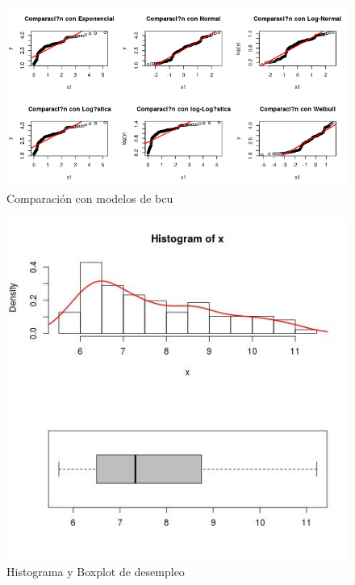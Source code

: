 \documentclass{article}
\begin{document}
\begin{figure}[h!]
\centering
\includegraphics[scale=0.5]{./plots/cm_bcu.png}
\caption{Comparación con modelos de bcu}
\end{figure}
\pagebreak
\begin{figure}[h!]
\centering
\includegraphics[scale=0.5]{./plots/histplot_desempleo.png}
\caption{Histograma y Boxplot de desempleo}
\end{figure}
\end{document}
